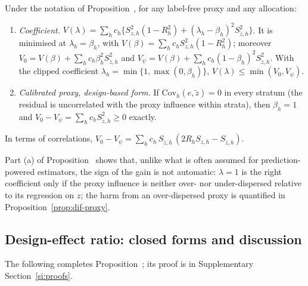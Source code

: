 \begin{proposition}\label{prop:dif-var-ext}
Under the notation of Proposition~, for any label-free proxy and any allocation:
\begin{enumerate}
\item[(a)] \emph{Coefficient.} $V(\lambda)=\sum_hc_h\{S^2_{z,h}(1-R_h^2)+(\lambda_h-\beta_h)^2S^2_{\tilde z,h}\}$. It is minimised at
$\lambda_h=\beta_h$, with $V(\beta)=\sum_hc_hS^2_{z,h}(1-R_h^2)$; moreover
$V_0=V(\beta)+\sum_hc_h\beta_h^2S^2_{\tilde z,h}$ and $V_\psi=V(\beta)+\sum_hc_h(1-\beta_h)^2S^2_{\tilde z,h}$. With the clipped coefficient
$\lambda_h=\min\{1,\max(0,\beta_h)\}$, $V(\lambda)\le\min(V_0,V_\psi)$.
\item[(b)] \emph{Calibrated proxy, design-based form.} If $\mathrm{Cov}_h(e,\tilde z)=0$ in every stratum (the residual is uncorrelated with the
proxy influence within strata), then $\beta_h=1$ and $V_0-V_\psi=\sum_hc_hS^2_{\tilde z,h}\ge0$ exactly.
\end{enumerate}
In terms of correlations, $V_0-V_\psi=\sum_hc_h\,S_{\tilde z,h}\,(2R_hS_{z,h}-S_{\tilde z,h})$.
\end{proposition}

Part (a) of Proposition~ shows that, unlike what is often assumed for prediction-powered estimators, the sign of the gain is not automatic:
$\lambda=1$ is the right coefficient only if the proxy influence is neither over- nor under-dispersed relative to
its regression on $z$; the harm from an over-dispersed proxy is quantified in Proposition~\ref{prop:dif-proxy}.

\subsection{Design-effect ratio: closed forms and discussion}\label{si:theory-deff-ratio}

The following completes Proposition~; its proof is in Supplementary Section~\ref{si:proofs}.


